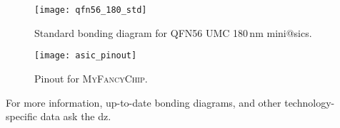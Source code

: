     \begin{figure}
      \centering
      \texttt{[image: qfn56\_180\_std]}
      \caption{Standard bonding diagram for QFN56 UMC 180\,nm mini@sics.}%
      \label{fig:bonding_diagram}
    \end{figure}

    \begin{figure}
      \centering
      \texttt{[image: asic\_pinout]}
      \caption{Pinout for \textsc{MyFancyChip}.}%
      \label{fig:asic_pinout}
    \end{figure}

    For more information, up-to-date bonding diagrams, and other technology-specific data ask the \gls{dz}.
